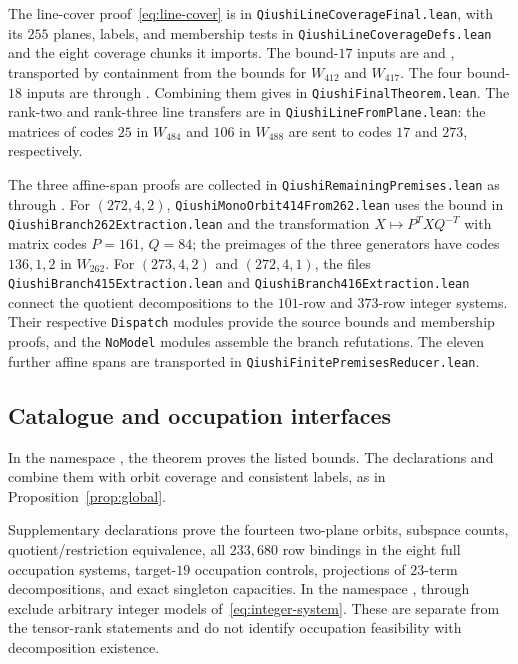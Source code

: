 The line-cover proof~\eqref{eq:line-cover} is in
\nolinkurl{QiushiLineCoverageFinal.lean}, with its $255$ planes,
labels, and membership tests in \nolinkurl{QiushiLineCoverageDefs.lean}
and the eight coverage chunks it imports. The bound-$17$ inputs are
 and ,
transported by containment from the bounds for $W_{412}$ and $W_{417}$.
The four bound-$18$ inputs are  through
. Combining them gives
 in \nolinkurl{QiushiFinalTheorem.lean}.
The rank-two and rank-three line transfers are in
\nolinkurl{QiushiLineFromPlane.lean}: the matrices of codes $25$ in
$W_{484}$ and $106$ in $W_{488}$ are sent to codes $17$ and $273$,
respectively.

The three affine-span proofs are collected in
\nolinkurl{QiushiRemainingPremises.lean} as
 through
.
For $(272,4,2)$, \nolinkurl{QiushiMonoOrbit414From262.lean}
uses the bound in \nolinkurl{QiushiBranch262Extraction.lean}
and the transformation $X\mapsto P^TXQ^{-T}$ with matrix codes
$P=161$, $Q=84$; the preimages of the three generators have codes
$136,1,2$ in $W_{262}$.
For $(273,4,2)$ and $(272,4,1)$, the files
\nolinkurl{QiushiBranch415Extraction.lean} and
\nolinkurl{QiushiBranch416Extraction.lean} connect the quotient
decompositions to the $101$-row and $373$-row integer systems.
Their respective \nolinkurl{Dispatch} modules provide the source
bounds and membership proofs, and the \nolinkurl{NoModel} modules
assemble the branch refutations. The eleven further affine spans are
transported in \nolinkurl{QiushiFinitePremisesReducer.lean}.

\subsection{Catalogue and occupation interfaces}
In the namespace , the theorem
 proves the listed bounds.
The declarations  and
 combine them with orbit coverage
and consistent labels, as in Proposition~\ref{prop:global}.

Supplementary declarations prove the fourteen two-plane orbits,
subspace counts, quotient/restriction equivalence, all
$233{,}680$ row bindings in the eight full occupation systems,
target-$19$ occupation controls, projections of $23$-term
decompositions, and exact singleton capacities.
In the namespace ,
 through 
exclude arbitrary integer models of~\eqref{eq:integer-system}.
These are separate from the tensor-rank statements and do not identify
occupation feasibility with decomposition existence.

